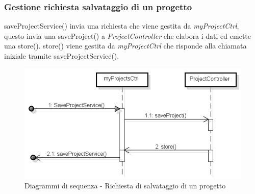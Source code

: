 	
	
	\subsubsection{Gestione richiesta salvataggio di un progetto}
	saveProjectService() invia una richiesta che viene gestita da \textit{myProjectCtrl}, questo invia una saveProject() a \textit{ProjectController} che elabora i dati ed emette una store(). store() viene gestita da \textit{myProjectCtrl} che risponde alla chiamata iniziale tramite saveProjectService().
	
	\begin{figure}[H]
		\centering
		\includegraphics[scale=0.5]{img/save.png}
		\caption{Diagrammi di sequenza - Richiesta di salvataggio di un progetto}
	\end{figure}
	\newpage
